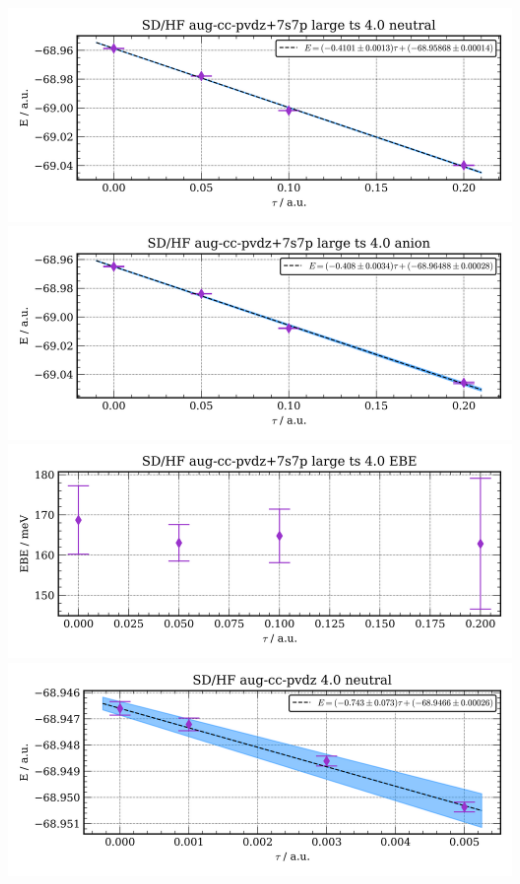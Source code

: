 \includegraphics[width=\textwidth,keepaspectratio]{images/SDshivHF__aug-cc-pvdz+7s7p_large_ts__4p0_01_neutral.png}
\includegraphics[width=\textwidth,keepaspectratio]{images/SDshivHF__aug-cc-pvdz+7s7p_large_ts__4p0_02_anion.png}
\includegraphics[width=\textwidth,keepaspectratio]{images/SDshivHF__aug-cc-pvdz+7s7p_large_ts__4p0_03_ebe.png}
\includegraphics[width=\textwidth,keepaspectratio]{images/SDshivHF__aug-cc-pvdz__4p0_01_neutral.png}
